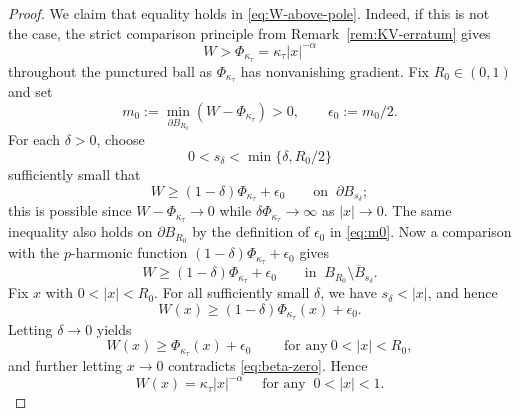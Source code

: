 \documentclass[reqno,12pt]{amsart}
\numberwithin{equation}{section}
\theoremstyle{remark}
\begin{document}
\begin{proof}
We claim that equality holds in \eqref{eq:W-above-pole}.  Indeed, if this is not the case, the  strict comparison principle from Remark~\ref{rem:KV-erratum} gives
$$
W>\Phi_{\kappa_\tau}=\kappa_\tau|x|^{-\alpha}
$$
throughout the punctured ball as $\Phi_{\kappa_\tau}$ has nonvanishing gradient.  Fix
$R_0\in(0,1)$ and set
\begin{equation}\label{eq:m0}
m_0:=\min_{\partial B_{R_0}}  (W-\Phi_{\kappa_\tau})>0,  \qquad  \epsilon_0:=m_0/2.
\end{equation}
For each $\delta>0$, choose 
$$0<s_\delta<\min\{\delta,R_0/2\}$$ 
sufficiently small that 
\begin{equation}\label{eq:inner-sphere}
     W\ge(1-\delta)\Phi_{\kappa_\tau}+\epsilon_0\qquad \text{on } \ \partial B_{s_\delta};
\end{equation}
this is possible since
$W-\Phi_{\kappa_\tau}\to0$ while
$\delta\Phi_{\kappa_\tau}\to\infty$ as $|x|\to 0$.  The same inequality also holds on $\partial B_{R_0}$ by the definition of $\epsilon_0$ in \eqref{eq:m0}.  Now a comparison with the
$p$-harmonic function $(1-\delta)\Phi_{\kappa_\tau}+\epsilon_0$ gives  
$$
W\ge(1-\delta)\Phi_{\kappa_\tau}+\epsilon_0
\qquad\text{in } \ B_{R_0}\setminus\overline B_{s_\delta}.
$$
Fix $x$ with $0<|x|<R_0$. For all sufficiently small $\delta$, we have
$s_\delta<|x|$, and hence
$$
W(x)\ge(1-\delta)\Phi_{\kappa_\tau}(x)+\epsilon_0.
$$
Letting $\delta\to 0$ yields
$$
W(x)\ge\Phi_{\kappa_\tau}(x)+\epsilon_0
\qquad \text{ for any} \ 0<|x|<R_0,
$$
and further letting $x\to0$ contradicts \eqref{eq:beta-zero}.  Hence
\begin{equation}\label{eq:exact-pole-limit}
W(x)=\kappa_\tau|x|^{-\alpha}
\quad \text{ for any } \ 0<|x|<1.
\end{equation}


\end{proof}
\end{document}

